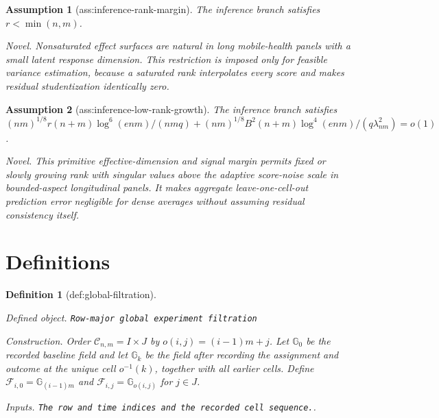 \documentclass{article}
\newtheorem{assumption}{Assumption}
\newtheorem{definition}{Definition}
\begin{document}
\begin{assumption}[ass:inference-rank-margin]\label{ass:inference-rank-margin}
The inference branch satisfies \(r<\min(n,m)\).
\par\smallskip\noindent\emph{Novel.} Nonsaturated effect surfaces are natural in long mobile-health panels with a small latent response dimension. This restriction is imposed only for feasible variance estimation, because a saturated rank interpolates every score and makes residual studentization identically zero.
\end{assumption}

\begin{assumption}[ass:inference-low-rank-growth]\label{ass:inference-low-rank-growth}
The inference branch satisfies \((nm)^{1/8}r(n+m)\log^6(enm)/(nmq)+(nm)^{1/8}B^2(n+m)\log^4(enm)/(q\lambda_{nm}^2)=o(1)\).
\par\smallskip\noindent\emph{Novel.} This primitive effective-dimension and signal margin permits fixed or slowly growing rank with singular values above the adaptive score-noise scale in bounded-aspect longitudinal panels. It makes aggregate leave-one-cell-out prediction error negligible for dense averages without assuming residual consistency itself.
\end{assumption}

\section{Definitions}

\begin{definition}[def:global-filtration]\label{def:global-filtration}
\par\smallskip\noindent\emph{Defined object.} \texttt{Row-\allowbreak{}major global experiment filtration}
\par\smallskip\noindent\emph{Construction.} Order \(\mathcal C_{n,m}=I\times J\) by \(o(i,j)=(i-1)m+j\). Let \(\mathbb G_0\) be the recorded baseline field and let \(\mathbb G_k\) be the field after recording the assignment and outcome at the unique cell \(o^{-1}(k)\), together with all earlier cells. Define \(\mathcal F_{i,0}=\mathbb G_{(i-1)m}\) and \(\mathcal F_{i,j}=\mathbb G_{o(i,j)}\) for \(j\in J\).
\par\smallskip\noindent\emph{Inputs.} \texttt{The row and time indices and the recorded cell sequence.}.
\end{definition}
\end{document}
